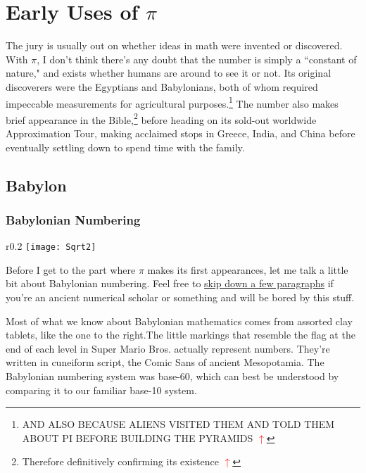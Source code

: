 \documentclass[11pt,titlepage]{article}
\begin{document}
\section*{Early Uses of $\pi$}

The jury is usually out on whether ideas in math were invented or discovered. With $\pi$, I don't think there's any doubt that the number is simply a ``constant of nature," and exists whether humans are around to see it or not. Its original discoverers were the Egyptians and Babylonians, both of whom required impeccable measurements \hypertarget{bible}{}for agricultural purposes\label{agriculture}.\footnote{AND ALSO BECAUSE ALIENS VISITED THEM AND TOLD THEM ABOUT PI BEFORE BUILDING THE PYRAMIDS \hyperref[agriculture]{\textbf{\textcolor{red}{$\uparrow$}}}} The number also makes brief appearance in the Bible,\footnote{Therefore definitively confirming its existence \hyperlink{bible}{\textbf{\textcolor{red}{$\uparrow$}}}} before heading on its sold-out worldwide Approximation Tour, making acclaimed stops in Greece, India, and China before eventually settling down to spend time with the family.

\subsection*{Babylon} 

\subsubsection*{Babylonian Numbering}

\begin{wrapfigure}{r}{0.2\textwidth}
\centering
\vspace{-0.7cm}
\texttt{[image: Sqrt2]}
\end{wrapfigure}
Before I get to the part where $\pi$ makes its first appearances, let me talk a little bit about Babylonian numbering. Feel free to \hyperref[babylonpi]{skip down a few paragraphs} if you're an ancient numerical scholar or something and will be bored by this stuff. 

Most of what we know about Babylonian mathematics comes from assorted clay tablets, like the one to the right.The little markings that resemble the flag at the end of each level in Super Mario Bros. actually represent numbers. They're written in cuneiform script, the Comic Sans of ancient Mesopotamia. The Babylonian numbering system was base-60, which can best be understood by comparing it to our familiar base-10 system. 
\end{document}
